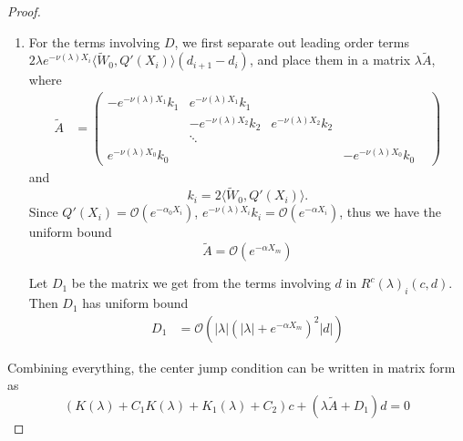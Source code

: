 \documentclass[thesis.tex]{subfiles}
\begin{document}
\begin{lemma}
\begin{proof}
\begin{enumerate}
\item For the terms involving $D$, we first separate out leading order terms $2 \lambda e^{-\nu(\lambda)X_i} \langle \tilde{W}_0, Q'(X_i) \rangle (d_{i+1} - d_i )$, and place them in a matrix $\lambda \tilde{A}$, where
\begin{align*}
\tilde{A} &= \begin{pmatrix}
-e^{-\nu(\lambda)X_1} k_1 & e^{-\nu(\lambda)X_1} k_1 \\
& -e^{-\nu(\lambda)X_2} k_2 & e^{-\nu(\lambda)X_2} k_2 \\
& \ddots \\
e^{-\nu(\lambda)X_0} k_0 & &  & -e^{-\nu(\lambda)X_0} k_0 & 
\end{pmatrix}
\end{align*}
and
\[
k_i = 2 \langle \tilde{W}_0, Q'(X_i) \rangle.
\]
Since $Q'(X_i) = \mathcal{O}(e^{-\alpha_0 X_i})$, $e^{-\nu(\lambda)X_i} k_i = \mathcal{O}(e^{-\alpha X_i})$, thus we have the uniform bound
\[
\tilde{A} = \mathcal{O}(e^{-\alpha X_m})
\]

Let $D_1$ be the matrix we get from the terms involving $d$ in $R^c(\lambda)_i(c, d)$. Then $D_1$ has uniform bound
\begin{align*}
D_1 &= \mathcal{O}(|\lambda|(|\lambda| + e^{-\alpha X_m})^2|d|)
\end{align*}
\end{enumerate}

Combining everything, the center jump condition can be written in matrix form as
\[
(K(\lambda) + C_1 K(\lambda) + K_1(\lambda) + C_2) c + (\lambda \tilde{A} + D_1) d = 0
\]
\end{proof}
\end{lemma}
\end{document}
